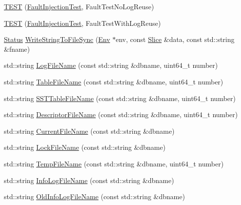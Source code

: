 \begin{DoxyCompactItemize}
\item 
\mbox{\hyperlink{namespaceleveldb_ac6e00c81300b5ed2dda43d329ae83651}{T\+E\+ST}} (\mbox{\hyperlink{classleveldb_1_1_fault_injection_test}{Fault\+Injection\+Test}}, Fault\+Test\+No\+Log\+Reuse)
\item 
\mbox{\hyperlink{namespaceleveldb_a0d5b1f86ae1ddc161d758cbca56e09c7}{T\+E\+ST}} (\mbox{\hyperlink{classleveldb_1_1_fault_injection_test}{Fault\+Injection\+Test}}, Fault\+Test\+With\+Log\+Reuse)
\item 
\mbox{\hyperlink{classleveldb_1_1_status}{Status}} \mbox{\hyperlink{namespaceleveldb_aaa2ccf468819a9d769dd0bf38674a6e9}{Write\+String\+To\+File\+Sync}} (\mbox{\hyperlink{classleveldb_1_1_env}{Env}} $\ast$env, const \mbox{\hyperlink{classleveldb_1_1_slice}{Slice}} \&data, const std\+::string \&fname)
\item 
std\+::string \mbox{\hyperlink{namespaceleveldb_aba6dbc953c414e0069c35662ea806b9a}{Log\+File\+Name}} (const std\+::string \&dbname, uint64\+\_\+t number)
\item 
std\+::string \mbox{\hyperlink{namespaceleveldb_a0d893a7fbbbc4a94ec75af4f6be33dbb}{Table\+File\+Name}} (const std\+::string \&dbname, uint64\+\_\+t number)
\item 
std\+::string \mbox{\hyperlink{namespaceleveldb_a576acf7326a43527670f08edd3e3e12b}{S\+S\+T\+Table\+File\+Name}} (const std\+::string \&dbname, uint64\+\_\+t number)
\item 
std\+::string \mbox{\hyperlink{namespaceleveldb_a1ea160b70b18dc85b537e16db3d6ddd0}{Descriptor\+File\+Name}} (const std\+::string \&dbname, uint64\+\_\+t number)
\item 
std\+::string \mbox{\hyperlink{namespaceleveldb_affcb2d434f2a772d7c764cd5d1797a9a}{Current\+File\+Name}} (const std\+::string \&dbname)
\item 
std\+::string \mbox{\hyperlink{namespaceleveldb_a9f772d88ab2d47dec0d68e5eb85c579e}{Lock\+File\+Name}} (const std\+::string \&dbname)
\item 
std\+::string \mbox{\hyperlink{namespaceleveldb_a0563c700d6ff17e88f429464c1442da1}{Temp\+File\+Name}} (const std\+::string \&dbname, uint64\+\_\+t number)
\item 
std\+::string \mbox{\hyperlink{namespaceleveldb_ac40453ca7f9c0bd723873ffe32dc12a2}{Info\+Log\+File\+Name}} (const std\+::string \&dbname)
\item 
std\+::string \mbox{\hyperlink{namespaceleveldb_a2964797a29cbda9d37cce54109eefdc6}{Old\+Info\+Log\+File\+Name}} (const std\+::string \&dbname)
\item 

\end{DoxyCompactItemize}
